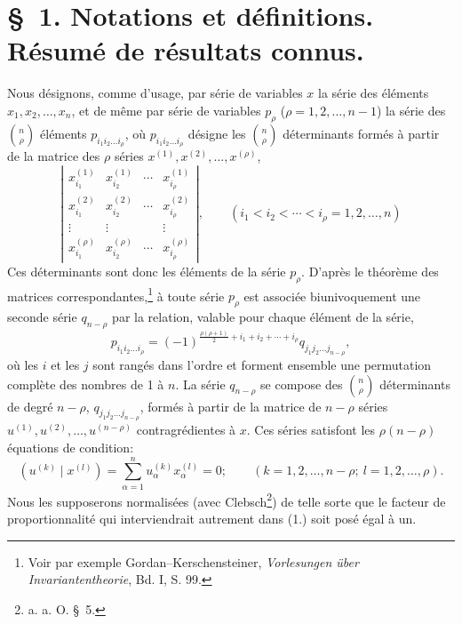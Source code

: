 \documentclass[11pt]{article}
\begin{document}
\section*{\S\ 1. Notations et définitions. Résumé de résultats connus.}
Nous désignons, comme d'usage, par série de variables $x$ la série des éléments $x_1,x_2,\ldots,x_n$, et de même par série de variables $p_\rho$ ($\rho=1,2,\ldots,n-1$) la série des $\binom n\rho$ éléments $p_{i_1i_2\ldots i_\rho}$, où $p_{i_1i_2\ldots i_\rho}$ désigne les $\binom n\rho$ déterminants formés à partir de la matrice des $\rho$ séries $x^{(1)},x^{(2)},\ldots,x^{(\rho)}$,
\[
\left|\begin{array}{cccc}
 x_{i_1}^{(1)}&x_{i_2}^{(1)}&\cdots&x_{i_\rho}^{(1)}\\
 x_{i_1}^{(2)}&x_{i_2}^{(2)}&\cdots&x_{i_\rho}^{(2)}\\
 \vdots&\vdots&&\vdots\\
 x_{i_1}^{(\rho)}&x_{i_2}^{(\rho)}&\cdots&x_{i_\rho}^{(\rho)}
\end{array}\right|,
\qquad (i_1<i_2<\cdots<i_\rho=1,2,\ldots,n)
\]
Ces déterminants sont donc les éléments de la série $p_\rho$. D'après le théorème des matrices correspondantes,\footnote{Voir par exemple Gordan--Kerschensteiner, \emph{Vorlesungen über Invariantentheorie}, Bd. I, S. 99.} à toute série $p_\rho$ est associée biunivoquement une seconde série $q_{n-\rho}$ par la relation, valable pour chaque élément de la série,
\begin{equation}
 p_{i_1i_2\ldots i_\rho}=(-1)^{\frac{\rho(\rho+1)}{2}+i_1+i_2+\cdots+i_\rho}q_{j_1j_2\ldots j_{n-\rho}},
\tag{1}
\end{equation}
où les $i$ et les $j$ sont rangés dans l'ordre et forment ensemble une permutation complète des nombres de 1 à $n$. La série $q_{n-\rho}$ se compose des $\binom n\rho$ déterminants de degré $n-\rho$, $q_{j_1j_2\ldots j_{n-\rho}}$, formés à partir de la matrice de $n-\rho$ séries $u^{(1)},u^{(2)},\ldots,u^{(n-\rho)}$ contragrédientes à $x$. Ces séries satisfont les $\rho(n-\rho)$ équations de condition:
\begin{equation}
 (u^{(k)}\mid x^{(l)})=\sum_{\alpha=1}^{n}u_\alpha^{(k)}x_\alpha^{(l)}=0;
 \qquad (k=1,2,\ldots,n-\rho;\ l=1,2,\ldots,\rho).
\tag{2}
\end{equation}
Nous les supposerons normalisées (avec Clebsch\footnote{a. a. O. \S\ 5.}) de telle sorte que le facteur de proportionnalité qui interviendrait autrement dans (1.) soit posé égal à un.
\end{document}
